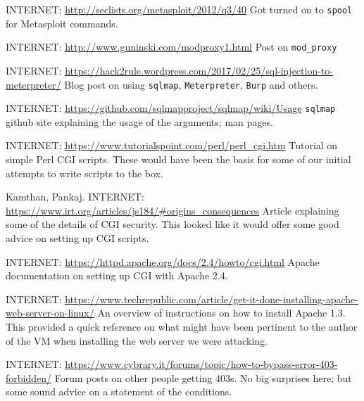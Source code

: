 \endnote{[17]}  INTERNET:  \url{http://seclists.org/metasploit/2012/q3/40}
Got turned on to \texttt{spool} for Metasploit commands.

\endnote{[18]}  INTERNET: \url{http://www.guninski.com/modproxy1.html}
Post on \texttt{mod\_proxy}

\endnote{[19]}  INTERNET: \url{https://hack2rule.wordpress.com/2017/02/25/sql-injection-to-meterpreter/}
Blog post on using \texttt{sqlmap}, \texttt{Meterpreter}, \texttt{Burp} and others.

\endnote{[20]}  INTERNET: \url{https://github.com/sqlmapproject/sqlmap/wiki/Usage}
\texttt{sqlmap} github site explaining the usage of the arguments; man pages.

\endnote{[21]}  INTERNET: \url{https://www.tutorialspoint.com/perl/perl_cgi.htm}
Tutorial on simple Perl CGI scripts.  These would have been the basis for some of our initial attempts to write scripts to the box.  

\endnote{[22]}  Kamthan, Pankaj.  INTERNET: \url{https://www.irt.org/articles/js184/\#origins_consequences}
Article explaining some of the details of CGI security.  This looked like it would offer some good advice on setting up CGI scripts.

\endnote{[23]}  INTERNET: \url{https://httpd.apache.org/docs/2.4/howto/cgi.html}
Apache documentation on setting up CGI with Apache 2.4.

\endnote{[24]}  INTERNET: \url{https://www.techrepublic.com/article/get-it-done-installing-apache-web-server-on-linux/}
An overview of instructions on how to install Apache 1.3.  This provided a quick reference on what might have been pertinent to the author of the VM when installing the web server we were attacking.

\endnote{[25]}  INTERNET: \url{https://www.cybrary.it/forums/topic/how-to-bypass-error-403-forbidden/}
Forum posts on other people getting 403s.  No big surprises here; but some sound advice on a statement of the conditions.


